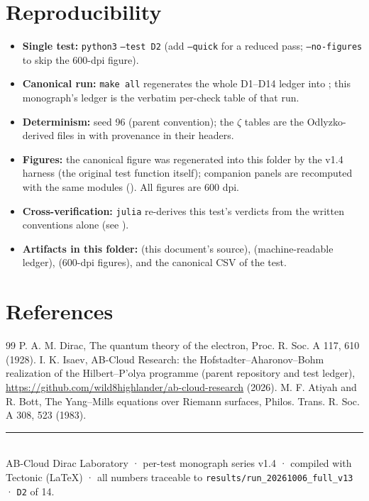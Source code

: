 \documentclass[11pt,a4paper]{article}
\begin{document}
\section{Reproducibility}
\begin{itemize}[leftmargin=1.2em, itemsep=0.15em]
\item \textbf{Single test:} \texttt{python3}  \texttt{--test D2} (add \texttt{--quick} for a reduced pass; \texttt{--no-figures} to skip the 600-dpi figure).
\item \textbf{Canonical run:} \texttt{make all} regenerates the whole D1--D14 ledger into ; this monograph's ledger is the verbatim per-check table of that run.
\item \textbf{Determinism:} seed 96 (parent convention); the $\zeta$ tables are the Odlyzko-derived files in  with provenance in their headers.
\item \textbf{Figures:} the canonical figure was regenerated into this folder by the v1.4 harness (the original test function itself); companion panels are recomputed with the same modules (). All figures are 600 dpi.
\item \textbf{Cross-verification:} \texttt{julia}  re-derives this test's verdicts from the written conventions alone (see ).
\item \textbf{Artifacts in this folder:}  (this document's source),  (machine-readable ledger),  (600-dpi figures), and the canonical CSV of the test.
\end{itemize}

\section*{References}
\begin{thebibliography}{99}\small
{} P. A. M. Dirac, The quantum theory of the electron, Proc. R. Soc. A 117, 610 (1928).
 I. K. Isaev, AB-Cloud Research: the Hofstadter--Aharonov--Bohm realization of the Hilbert--P'olya programme (parent repository and test ledger), \url{https://github.com/wild8highlander/ab-cloud-research} (2026).
 M. F. Atiyah and R. Bott, The Yang--Mills equations over Riemann surfaces, Philos. Trans. R. Soc. A 308, 523 (1983).
\end{thebibliography}

\vfill
\noindent\rule{\textwidth}{0.4pt}\\[0.2em]
{\footnotesize\color{labgray} AB-Cloud Dirac Laboratory · per-test monograph series v1.4 · compiled with Tectonic (LaTeX) · all numbers traceable to \texttt{results/run\_20261006\_full\_v13} · \texttt{D2} of 14.}
\end{document}
